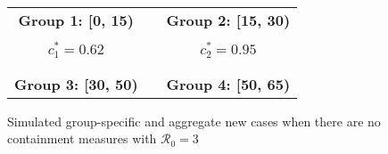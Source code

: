 \documentclass[12pt]{article}
\begin{document}
\begin{figure}[!hp]%
\caption
{Simulated group-specific and aggregate new cases when there are no containment measures with ${\mathcal
{R}_0}=3$}%
\vspace{-0.2cm}%
\footnotesize
\label{fig: multigroup}

\begin{center}%
\begin{tabular}
[c]{ccc}%
\textbf{Group 1: [0, 15)} &  & \textbf{Group 2: [15, 30)}\\%
{\includegraphics[
height=2.1465in,
width=2.6783in
]%
{figs/theory_multigroup_L5_dcT_L1.png}%
}
&  &
{\includegraphics[
height=2.1465in,
width=2.6783in
]%
{figs/theory_multigroup_L5_dcT_L2.png}%
}
\\
$c_{1}^{\ast}=0.62$ &  & $c_{2}^{\ast}=0.95$\\
&  & \\
&  & \\
\textbf{Group 3: [30, 50)} &  & \textbf{Group 4: [50, 65)}\\%

\end{tabular}
\end{center}
\end{figure}
\end{document}
